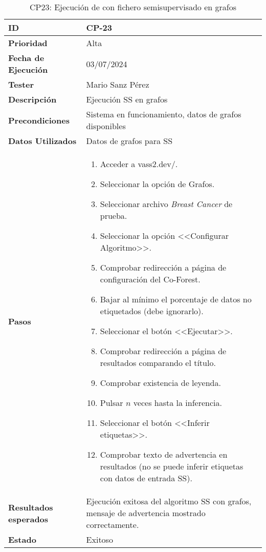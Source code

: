 \begin{table}[ht]
	\centering
	\renewcommand{\arraystretch}{1.5} %
	\begin{tabular}{>{\raggedright\arraybackslash}p{4cm} p{9.5cm}}
    \hline
    \rowcolor{gray!20}
    \textbf{ID} & CP-23\\
    \hline
    \rowcolor{white}
    \textbf{Prioridad} & Alta \\
    \hline
    \rowcolor{gray!20}
    \textbf{Fecha de Ejecución} & 03/07/2024 \\
    \hline
    \rowcolor{white}
    \textbf{Tester} & Mario Sanz Pérez \\
    \hline
    \rowcolor{gray!20}
    \textbf{Descripción} & Ejecución SS en grafos\\
    \hline
    \rowcolor{white}
    \textbf{Precondiciones} & Sistema en funcionamiento, datos de grafos disponibles\\
    \hline
    \rowcolor{white}
    \textbf{Datos Utilizados} & Datos de grafos para SS\\
    \hline
    \rowcolor{gray!20}
    \textbf{Pasos} & \begin{enumerate}
		\item Acceder a vass2.dev/.
        \item Seleccionar la opción de Grafos.
        \item Seleccionar archivo \textit{Breast Cancer} de prueba.
        \item Seleccionar la opción <<Configurar Algoritmo>>.
        \item Comprobar redirección a página de configuración del Co-Forest.
        \item Bajar al mínimo el porcentaje de datos no etiquetados (debe ignorarlo).
        \item Seleccionar el botón <<Ejecutar>>.
        \item Comprobar redirección a página de resultados comparando el título.
        \item Comprobar existencia de leyenda.
        \item Pulsar $n$ veces hasta la inferencia.
        \item Seleccionar el botón <<Inferir etiquetas>>.
        \item Comprobar texto de advertencia en resultados (no se puede inferir etiquetas con datos de entrada SS).
    \end{enumerate}\\
	\hline
    \rowcolor{gray!20}
    \textbf{Resultados esperados} & Ejecución exitosa del algoritmo SS con grafos, mensaje de advertencia mostrado correctamente.\\
    \hline
    \rowcolor{white}
    \textbf{Estado} & Exitoso\\
    \hline
\end{tabular}
	\caption[CP23: Ejecución SS en grafos]{CP23: Ejecución de con fichero semisupervisado en grafos}
	
\end{table}

